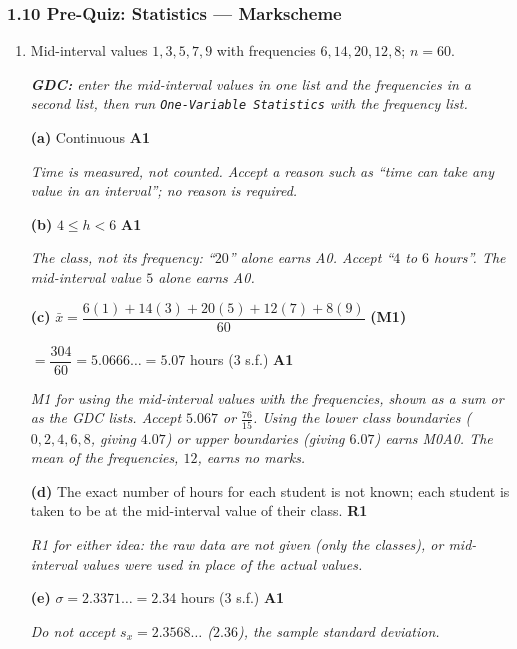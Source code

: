 \documentclass[12pt, twoside]{article}
\begin{document}
\subsubsection*{1.10 Pre-Quiz: Statistics --- Markscheme}

\begin{enumerate}[itemsep=0.3cm]

\item[1.] [Maximum mark: 8]

Mid-interval values $1, 3, 5, 7, 9$ with frequencies $6, 14, 20, 12, 8$;
$n = 60$.

\emph{\textbf{GDC:} enter the mid-interval values in one list and the
frequencies in a second list, then run \texttt{One-Variable Statistics} with
the frequency list.}

\textbf{(a)} Continuous \hfill \textbf{A1}

\emph{Time is measured, not counted. Accept a reason such as ``time can
take any value in an interval''; no reason is required.}

\textbf{(b)} $4 \le h < 6$ \hfill \textbf{A1}

\emph{The class, not its frequency: ``$20$'' alone earns A0. Accept
``$4$ to $6$ hours''. The mid-interval value $5$ alone earns A0.}

\textbf{(c)} $\bar{x} = \dfrac{6(1) + 14(3) + 20(5) + 12(7) + 8(9)}{60}$
\hfill \textbf{(M1)}

$= \dfrac{304}{60} = 5.0666\ldots = 5.07$ hours (3 s.f.) \hfill \textbf{A1}

\emph{M1 for using the mid-interval values with the frequencies, shown as a
sum or as the GDC lists. Accept $5.067$ or $\frac{76}{15}$. Using the lower
class boundaries ($0, 2, 4, 6, 8$, giving $4.07$) or upper boundaries
(giving $6.07$) earns M0A0. The mean of the frequencies, $12$, earns no
marks.}

\textbf{(d)} The exact number of hours for each student is not known; each
student is taken to be at the mid-interval value of their class.
\hfill \textbf{R1}

\emph{R1 for either idea: the raw data are not given (only the classes), or
mid-interval values were used in place of the actual values.}

\textbf{(e)} $\sigma = 2.3371\ldots = 2.34$ hours (3 s.f.) \hfill \textbf{A1}

\emph{Do not accept $s_{x} = 2.3568\ldots$ ($2.36$), the sample standard
deviation.}


\end{enumerate}
\end{document}
